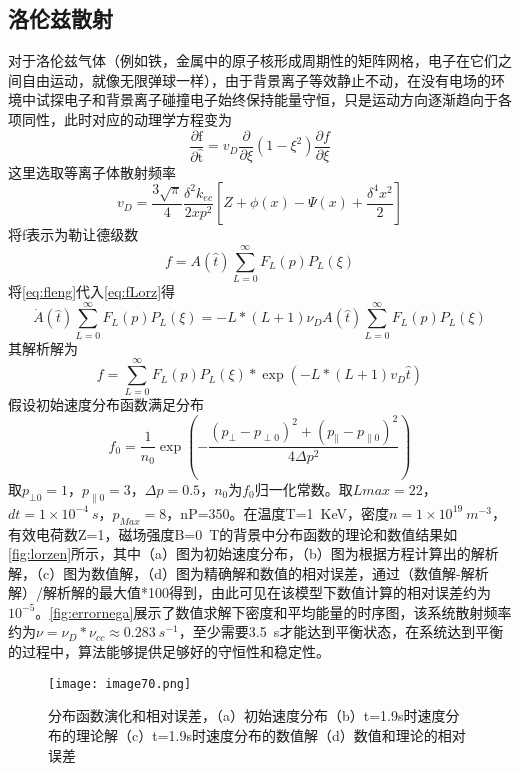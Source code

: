 \subsection{洛伦兹散射}
对于洛伦兹气体（例如铁，金属中的原子核形成周期性的矩阵网格，电子在它们之间自由运动，就像无限弹球一样），由于背景离子等效静止不动，在没有电场的环境中试探电子和背景离子碰撞电子始终保持能量守恒\cite{RN1839}，只是运动方向逐渐趋向于各项同性，此时对应的动理学方程变为
\begin{equation}\label{eq:fLorz}
\frac{\partial \mathrm{f}}{\partial \hat{\mathrm{t}}}=v_{D} \frac{\partial}{\partial \xi}\left(1-\xi^{2}\right) \frac{\partial f}{\partial \xi}
\end{equation}
这里选取等离子体散射频率
\begin{equation}
v_{D}=\frac{3 \sqrt{\pi}}{4} \frac{\delta^{2} k_{e c}}{2 x p^{2}}\left[Z+\phi(x)-\Psi(x)+\frac{\delta^{4} x^{2}}{2}\right]
\end{equation}
将f表示为勒让德级数
\begin{equation}\label{eq:fleng}
f=A(\hat{t}) \sum_{L=0}^{\infty} F_{L}(p) P_{L}(\xi)
\end{equation}
将\autoref{eq:fleng}代入\autoref{eq:fLorz}得
\begin{equation}
\dot{A}(\hat{t}) \sum_{L=0}^{\infty} F_{L}(p) P_{L}(\xi)=-L *(L+1) \nu_D A(\hat{t}) \sum_{L=0}^{\infty} F_{L}(p) P_{L}(\xi)
\end{equation}
其解析解为
\begin{equation}
f=\sum_{L=0}^{\infty} F_{L}(p) P_{L}(\xi) * \exp \left(-L *(L+1) v_{D} \hat{t}\right)
\end{equation}
假设初始速度分布函数满足分布
\begin{equation}
f_{0}=\frac{1}{n_{0}} \exp \left(-\frac{\left(p_{\perp}-p_{\perp 0}\right)^{2}+\left(p_{\|}-p_{\| 0}\right)^{2}}{4 \Delta p^{2}}\right)
\end{equation}
取$p_{⊥0}=1$，$p_{∥0}=3$，$Δp=0.5$，$n_0$为$f_0$归一化常数。取$Lmax=22$，$dt=1\times 10^{-4}~s$，$p_{Max}=8$，nP=350。在温度T=1~KeV，密度$n=1×10^{19}~ m^{-3}$，有效电荷数Z=1，磁场强度B=0~T的背景中分布函数的理论和数值结果如\autoref{fig:lorzen}所示，其中（a）图为初始速度分布，（b）图为根据方程计算出的解析解，（c）图为数值解，（d）图为精确解和数值的相对误差，通过（数值解-解析解）/解析解的最大值*100得到，由此可见在该模型下数值计算的相对误差约为$10^{-5}$。\autoref{fig:errornega}展示了数值求解下密度和平均能量的时序图，该系统散射频率约为$ν=ν_D*ν_{cc} \approx 0.283~s^{-1}$，至少需要3.5~s才能达到平衡状态，在系统达到平衡的过程中，算法能够提供足够好的守恒性和稳定性。
\begin{figure}
\centering
\texttt{[image: image70.png]}
\caption{\label{fig:lorzen}分布函数演化和相对误差，（a）初始速度分布（b）t=1.9s时速度分布的理论解（c）t=1.9s时速度分布的数值解（d）数值和理论的相对误差}
\end{figure}\par



